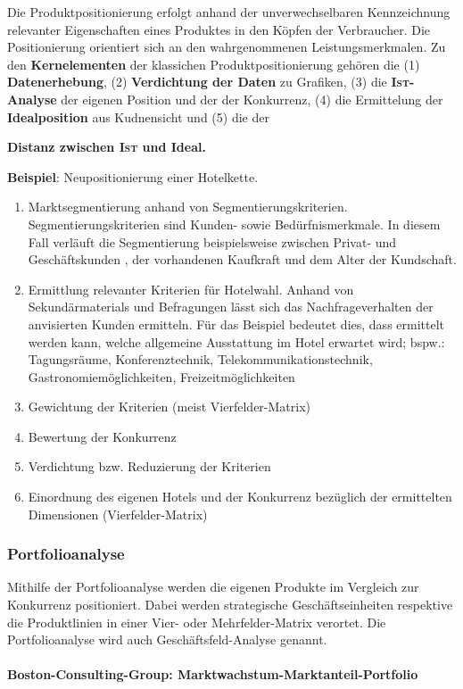 Die Produktpositionierung erfolgt anhand der unverwechselbaren Kennzeichnung relevanter Eigenschaften eines Produktes in den Köpfen der Verbraucher. Die Positionierung orientiert sich an den wahrgenommenen Leistungsmerkmalen. Zu den {\bf Kernelementen} der klassichen Produktpositionierung gehören die (1) {\bf Datenerhebung}, (2) {\bf Verdichtung der Daten} zu Grafiken, (3) die {\bf \textsc{Ist}-Analyse} der eigenen Position und der der Konkurrenz, (4) die Ermittelung der {\bf Idealposition} aus Kudnensicht und (5) die der {\bf Distanz zwischen \textsc{Ist} und Ideal.

{\bf Beispiel}: Neupositionierung einer Hotelkette.
\begin{enumerate}
	\item Marktsegmentierung anhand von Segmentierungskriterien. Segmentierungskriterien sind Kunden- sowie Bedürfnismerkmale. In diesem Fall verläuft die Segmentierung beispielsweise zwischen Privat- und Geschäftskunden , der vorhandenen Kaufkraft und dem Alter der Kundschaft.
	\item Ermittlung relevanter Kriterien für Hotelwahl. Anhand von Sekundärmaterials und Befragungen lässt sich das Nachfrageverhalten der anvisierten Kunden ermitteln. Für das Beispiel bedeutet dies, dass ermittelt werden kann, welche allgemeine Ausstattung im Hotel erwartet wird; bspw.: Tagungsräume, Konferenztechnik, Telekommunikationstechnik, Gastronomiemöglichkeiten, Freizeitmöglichkeiten
	\item Gewichtung der Kriterien (meist Vierfelder-Matrix)
	\item Bewertung der Konkurrenz 
	\item Verdichtung bzw. Reduzierung der Kriterien
	\item Einordnung des eigenen Hotels und der Konkurrenz bezüglich der ermittelten Dimensionen (Vierfelder-Matrix)
\end{enumerate}	 
	 
\subsubsection{Portfolioanalyse}

Mithilfe der Portfolioanalyse werden die eigenen Produkte im Vergleich zur Konkurrenz positioniert. Dabei werden strategische Geschäftseinheiten respektive die Produktlinien in einer Vier- oder Mehrfelder-Matrix verortet. Die Portfolioanalyse wird auch Geschäftsfeld-Analyse genannt.

\paragraph{Boston-Consulting-Group: Marktwachstum-Marktanteil-Portfolio}~\\

}
